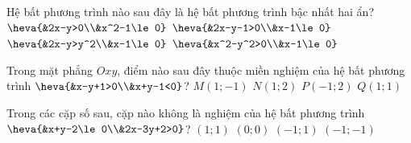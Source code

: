 \begin{ex}%
	Hệ bất phương trình nào sau đây là hệ bất phương trình bậc nhất hai ẩn?
	\choice
	{$\heva{&2x-y>0\\&x^2-1\le 0}$}
	{\True $\heva{&2x-y-1>0\\&x-1\le 0}$}
	{$\heva{&2x-y>y^2\\&x-1\le 0}$}
	{$\heva{&x^2-y^2>0\\&x-1\le 0}$}
\end{ex}
\begin{ex}%
	Trong mặt phẳng $Oxy$, điểm nào sau đây thuộc miền nghiệm của hệ bất phương trình $\heva{&x-y+1>0\\&x+y-1<0}$?
	\choice
	{\True $M(1;-1)$}
	{$N(1;2)$}
	{$P(-1;2)$}
	{$Q(1;1)$}
\end{ex}
\begin{ex}%
	Trong các cặp số sau, cặp nào không là nghiệm của hệ bất phương trình $\heva{&x+y-2\le 0\\&2x-3y+2>0}$?
	\choice
	{$(1;1)$}
	{$(0;0)$}
	{\True $(-1;1)$}
	{$(-1;-1)$}
\end{ex}
